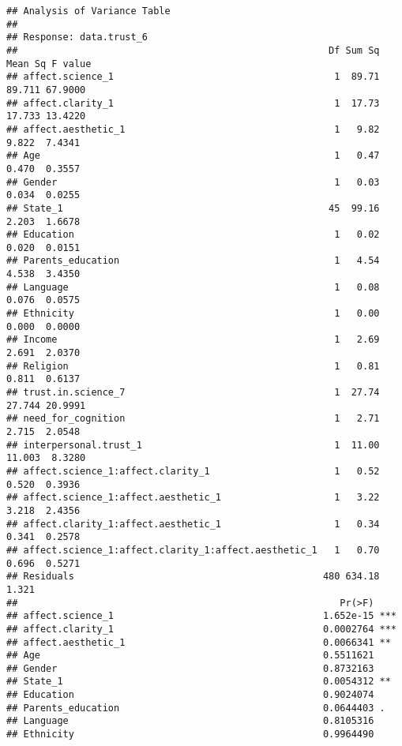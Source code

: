 \documentclass[
]{article}
\begin{document}
\begin{verbatim}
## Analysis of Variance Table
## 
## Response: data.trust_6
##                                                       Df Sum Sq Mean Sq F value
## affect.science_1                                       1  89.71  89.711 67.9000
## affect.clarity_1                                       1  17.73  17.733 13.4220
## affect.aesthetic_1                                     1   9.82   9.822  7.4341
## Age                                                    1   0.47   0.470  0.3557
## Gender                                                 1   0.03   0.034  0.0255
## State_1                                               45  99.16   2.203  1.6678
## Education                                              1   0.02   0.020  0.0151
## Parents_education                                      1   4.54   4.538  3.4350
## Language                                               1   0.08   0.076  0.0575
## Ethnicity                                              1   0.00   0.000  0.0000
## Income                                                 1   2.69   2.691  2.0370
## Religion                                               1   0.81   0.811  0.6137
## trust.in.science_7                                     1  27.74  27.744 20.9991
## need_for_cognition                                     1   2.71   2.715  2.0548
## interpersonal.trust_1                                  1  11.00  11.003  8.3280
## affect.science_1:affect.clarity_1                      1   0.52   0.520  0.3936
## affect.science_1:affect.aesthetic_1                    1   3.22   3.218  2.4356
## affect.clarity_1:affect.aesthetic_1                    1   0.34   0.341  0.2578
## affect.science_1:affect.clarity_1:affect.aesthetic_1   1   0.70   0.696  0.5271
## Residuals                                            480 634.18   1.321        
##                                                         Pr(>F)    
## affect.science_1                                     1.652e-15 ***
## affect.clarity_1                                     0.0002764 ***
## affect.aesthetic_1                                   0.0066341 ** 
## Age                                                  0.5511621    
## Gender                                               0.8732163    
## State_1                                              0.0054312 ** 
## Education                                            0.9024074    
## Parents_education                                    0.0644403 .  
## Language                                             0.8105316    
## Ethnicity                                            0.9964490    

\end{verbatim}
\end{document}
